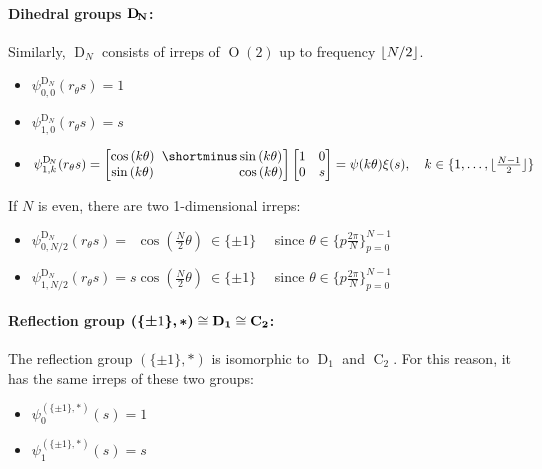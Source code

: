 \documentclass{article}
\newcommand{\lp}{\left(}
\newcommand{\rp}{\right)}
\renewcommand{\O}[1]{\ensuremath{\operatorname{O}(#1)}}
\newcommand{\D}[1]{\ensuremath{\operatorname{D}_{#1}}}
\newcommand{\C}[1]{\ensuremath{\operatorname{C}_{#1}}}
\newcommand{\DN}{\ensuremath{\operatorname{D}_{\!N}}}
\newcommand{\bC}[1]{\ensuremath{\mathbf{\operatorname{\bf C}_{#1}}}}
\newcommand{\bD}[1]{\ensuremath{\mathbf{\operatorname{\bf D}_{#1}}}}
\newcommand{\bDN}{\ensuremath{\mathbf{\operatorname{\bf D}_{\!N}}}}
\newcommand{\Flip}{(\{\pm 1\}, *)}
\newcommand{\bFlip}{\boldsymbol{(\{\pm} 1 \boldsymbol{\}, *)}}
\newcommand{\PSI}[1]{
	\begin{bmatrix}
		\cos\lp#1\rp & \!\!\!         \shortminus \sin\lp#1\rp \\
		\sin\lp#1\rp & \!\!\!\phantom{\shortminus}\cos\lp#1\rp \\
	\end{bmatrix}
}
\DeclarePairedDelimiter{\floor}{\lfloor}{\rfloor}
\begin{document}
\paragraph{Dihedral groups $\bDN$:}
Similarly, $\DN$ consists of irreps of $\O2$ up to frequency $\floor{N/2}$.
\begin{itemize}
\renewcommand\labelitemi{--}
	\item $\psi_{0, 0}^{\DN}(r_\theta s) = 1$
	\item $\psi_{1, 0}^{\DN}(r_\theta s) = s$
	\item $\psi_{1, k}^{\DN}(r_\theta s) = 
	\PSI{k\theta}
	\begin{bmatrix}
	1 & 0 \\
	0 & s \\
	\end{bmatrix} = \psi(k\theta)\xi(s), \quad k\in\{1,\dots,\floor{{N-1\over2}}\}$
\end{itemize}
If $N$ is even, there are two 1-dimensional irreps:
\begin{itemize}
\renewcommand\labelitemi{--}
	\item $\psi_{0, N/2}^{\DN}(r_\theta s) = \phantom{s}\cos\left(\frac{N}{2} \theta\right)\ \in \{\pm1\}\quad$ since $\theta\in\{p\frac{2\pi}{N}\}_{p=0}^{N-1}$
	\item $\psi_{1, N/2}^{\DN}(r_\theta s) = 		  s \cos\left(\frac{N}{2} \theta\right)\ \in \{\pm1\}\quad$ since $\theta\in\{p\frac{2\pi}{N}\}_{p=0}^{N-1}$ 
\end{itemize}


\paragraph{Reflection group $\bFlip \cong \bD1 \cong \bC2$:}
The reflection group $\Flip$ is isomorphic to $\D1$ and $\C2$.
For this reason, it has the same irreps of these two groups:
\begin{itemize}
	\renewcommand\labelitemi{--}
	\item $\psi_{0}^{\Flip}(s) = 1$
	\item $\psi_{1}^{\Flip}(s) = s$
\end{itemize}



\clearpage


\newcommand\onestrut{\rule[-10pt]{0pt}{25pt}}
\newcommand\twostrut{\rule[-19pt]{0pt}{43pt}}
\newcommand\Twostrut{\rule[-28pt]{0pt}{65pt}}
\newcommand\Tstrut{\rule{0pt}{8ex}}         \newcommand\Bstrut{\rule[-4ex]{0pt}{0pt}}   
\end{document}
